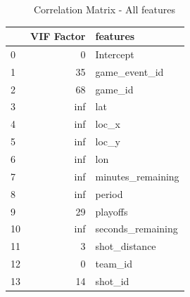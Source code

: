 \vskip 1cm
\begin{figure}
    \centering
    \caption{\label{fig:corr_matrix_allvars} Correlation Matrix - All features}
\end{figure}
\vskip 1cm
\cite{cm}

\resizebox{.3 \textwidth}{!} {
\begin{tabular}{lrl}
    \toprule
    {} &  VIF Factor &                 features \\
    \midrule
    0  &           0 &                Intercept \\
    1  &          35 &            game\_event\_id \\
    2  &          68 &                  game\_id \\
    3  &         inf &                      lat \\
    4  &         inf &                    loc\_x \\
    5  &         inf &                    loc\_y \\
    6  &         inf &                      lon \\
    7  &         inf &        minutes\_remaining \\
    8  &         inf &                   period \\
    9  &          29 &                 playoffs \\
    10 &         inf &        seconds\_remaining \\
    11 &           3 &            shot\_distance \\
    12 &           0 &                  team\_id \\
    13 &          14 &                  shot\_id \\
    \bottomrule
    \end{tabular}
    }
    \label{tbl:vifs}


